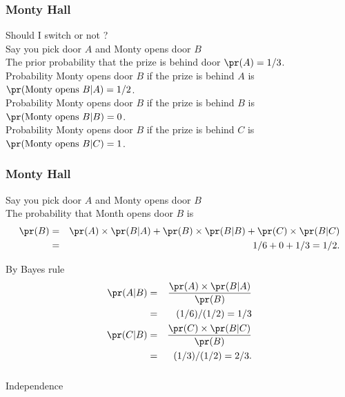 \begin{frame}[fragile]\frametitle{Monty Hall}


Should I switch or not ? \\ 

Say you pick door $A$ and Monty opens door $B$ \\ 

The prior probability that the prize is behind
door $\pr(A) = 1/3$. \\ 

Probability Monty opens door $B$ if the prize is behind $A$ is
$\pr(\mbox{Monty opens }B|A) = 1/2$. \\ 

Probability Monty opens door $B$ if the prize is behind $B$ is
$\pr(\mbox{Monty opens }B|B) = 0$. \\ 

Probability Monty opens door $B$ if the prize is behind $C$ is
$\pr(\mbox{Monty opens }B|C) = 1$. 

\end{frame}


\begin{frame}[fragile]\frametitle{Monty Hall}


Say you pick door $A$ and Monty opens door $B$ \\


The probability that Month opens door $B$ is 
\begin{eqnarray*}
\pr(B) &=& \pr(A) \times \pr(B|A) + \pr(B) \times \pr(B|B) + \pr(C)
\times \pr(B|C)\\
&  = & 1/6 + 0 + 1/3 = 1/2. 
\end{eqnarray*}

By Bayes rule
\begin{eqnarray*}
\pr(A|B) &=& \frac{\pr(A) \times \pr(B|A)}{\pr(B)}\\
         & = & (1/6)/(1/2) = 1/3 \\  
\pr(C|B) &=& \frac{\pr(C) \times \pr(B|C)}{\pr(B)}\\
         & = & (1/3)/(1/2) = 2/3. 
\end{eqnarray*}
\end{frame}

\begin{frame}[fragile]\frametitle{}
\begin{center}
{\Large Independence}

\end{center}
\end{frame}




